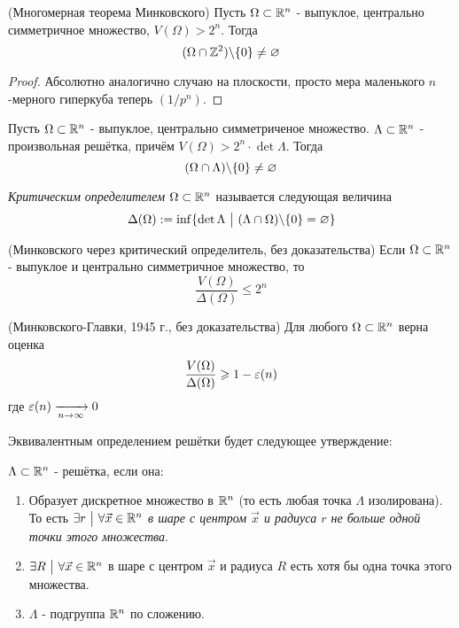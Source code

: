 \begin{theorem} (Многомерная теорема Минковского)
	Пусть $\Omega \subset \mathbb{R}^n$ - выпуклое, центрально симметричное множество, $V(\Omega) > 2^n$. Тогда
	\[
		(\Omega \cap \mathbb{Z}^2) \backslash \{0\} \neq \varnothing
	\]
\end{theorem}

\begin{proof}
	Абсолютно аналогично случаю на плоскости, просто мера маленького $n$-мерного гиперкуба теперь $(1/p^n)$.
\end{proof}

\begin{theorem}
	Пусть $\Omega \subset \mathbb{R}^n$ - выпуклое, центрально симметриченое множество. $\Lambda \subset \mathbb{R}^n$ - произвольная решётка, причём $V(\Omega) > 2^n \cdot \det \Lambda$. Тогда
	\[
		(\Omega \cap \Lambda) \backslash \{0\} \neq \varnothing
	\]
\end{theorem}

\begin{definition}
	\textit{Критическим определителем} $\Omega \subset \mathbb{R}^n$ называется следующая величина
	\[
		\Delta(\Omega) := \inf \{\det \Lambda \ \big|\  (\Lambda \cap \Omega) \backslash \{0\} = \varnothing\}
	\]
\end{definition}

\begin{theorem} (Минковского через критический определитель, без доказательства)
	Если $\Omega \subset \mathbb{R}^n$ - выпуклое и центрально симметричное множество, то
	\[
		\frac{V(\Omega)}{\Delta(\Omega)} \le 2^n
	\]
\end{theorem}

\begin{theorem} (Минковского-Главки, 1945 г., без доказательства)
	Для любого $\Omega \subset \mathbb{R}^n$ верна оценка
	\[
		\frac{V(\Omega)}{\Delta(\Omega)} \geqslant 1 - \varepsilon(n)
	\]
	где $\varepsilon(n) \xrightarrow[n \to \infty]{} 0$
\end{theorem}

\begin{proposition}
	Эквивалентным определением решётки будет следующее утверждение:
	
	$\Lambda \subset \mathbb{R}^n$ - решётка, если она:
	\begin{enumerate}
		\item Образует дискретное множество в $\mathbb{R}^n$ (то есть любая точка $\Lambda$ изолирована). То есть $\exists r \ \big|\  \forall \vec{x} \in \mathbb{R}^n$ \textit{в шаре с центром $\vec{x}$ и радиуса $r$ не больше одной точки этого множества}.
		
		\item $\exists R \ \big|\  \forall \vec{x} \in \mathbb{R}^n$ в шаре с центром $\vec{x}$ и радиуса $R$ есть хотя бы одна точка этого множества.
		
		\item $\Lambda$ - подгруппа $\mathbb{R}^n$ по сложению.
	\end{enumerate}
\end{proposition}

